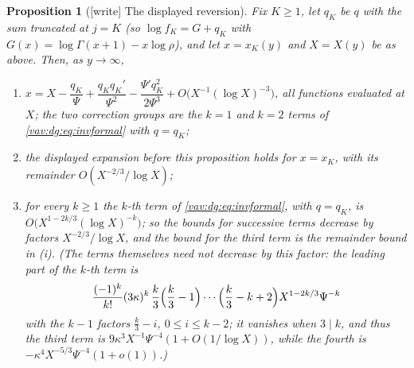 \documentclass[11pt]{article}
\newtheorem{proposition}[theorem]{Proposition}
\theoremstyle{remark}\newtheorem{remark}[theorem]{Remark}
\begin{document}
\begin{proposition}[{[write]} The displayed reversion]\label{vav:dg:prop:reversion}
Fix $K\ge1$, let $q_K$ be $q$ with the sum truncated at $j=K$ (so
$\log f_K=G+q_K$ with $G(x)=\log\Gamma(x+1)-x\log\rho$), and let $x=x_K(y)$
and $X=X(y)$ be as above. Then, as $y\to\infty$,
\begin{enumerate}
\item[(i)] $x=X-\dfrac{q_K}{\Psi}+\dfrac{q_Kq_K'}{\Psi^2}
-\dfrac{\Psi'q_K^2}{2\Psi^3}+O\bigl(X^{-1}(\log X)^{-3}\bigr)$, all
functions evaluated at $X$; the two correction groups are the $k=1$ and
$k=2$ terms of \eqref{vav:dg:eq:invformal} with $q=q_K$;
\item[(ii)] the displayed expansion before this proposition holds for $x=x_K$,
with its remainder $O(X^{-2/3}/\log X)$;
\item[(iii)] for every $k\ge1$ the $k$-th term of
\eqref{vav:dg:eq:invformal}, with $q=q_K$, is
$O\bigl(X^{1-2k/3}(\log X)^{-k}\bigr)$; so the bounds for successive terms
decrease by factors $X^{-2/3}/\log X$, and the bound for the third term is
the remainder bound in (i). (The terms themselves need not decrease by this
factor: the leading part of the $k$-th term is
\[
 \frac{(-1)^k}{k!}(3\kappa)^k\,\frac k3\Bigl(\frac k3-1\Bigr)\cdots
 \Bigl(\frac k3-k+2\Bigr)X^{1-2k/3}\Psi^{-k}
\]
with the $k-1$ factors $\frac k3-i$, $0\le i\le k-2$; it vanishes when
$3\mid k$, and thus the third term is $9\kappa^3X^{-1}\Psi^{-4}(1+O(1/\log X))$, while the
fourth is $-\kappa^4X^{-5/3}\Psi^{-4}(1+o(1))$.)
\end{enumerate}
\end{proposition}
\end{document}
